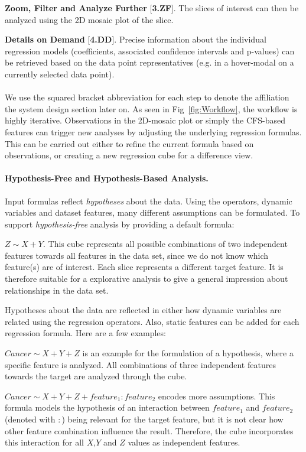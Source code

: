 \documentclass[journal]{style/vgtc} 			          %
\begin{document}
\textbf{Zoom, Filter and Analyze Further} [\textbf{3.ZF}]. The slices of interest can then be analyzed using the 2D mosaic plot of the slice.

\textbf{Details on Demand} [\textbf{4.DD}]. Precise information about the individual regression models (coefficients, associated confidence intervals and p-values) can be retrieved based on the data point representatives (e.g. in a hover-modal on a currently selected data point).
\\\\
We use the squared bracket abbreviation for each step to denote the affiliation the system design section later on.
As seen in Fig~\ref{fig:Workflow}, the workflow is highly iterative.
Observations in the 2D-mosaic plot or simply the CFS-based features can trigger new analyses by adjusting the underlying regression formulas.
This can be carried out either to refine the current formula based on observations, or creating a new regression cube for a difference view.
\paragraph{Hypothesis-Free and Hypothesis-Based Analysis.}
Input formulas reflect \emph{hypotheses} about the data.
Using the operators, dynamic variables and dataset features, many different assumptions can be formulated.
To support \emph{hypothesis-free} analysis by providing a default formula:

$Z \sim X + Y$.
This cube represents all possible combinations of two independent features towards all features in the data set, since we do not know which feature(s) are of interest.
Each slice represents a different target feature.
It is therefore suitable for a explorative analysis to give a general impression about relationships in the data set.

Hypotheses about the data are reflected in either how dynamic variables are related using the regression operators.
Also, static features can be added for each regression formula.
Here are a few examples:

$Cancer \sim X + Y + Z$ is an example for the formulation of a hypothesis, where a specific feature is analyzed.
All combinations of three independent features towards the target are analyzed through the cube.

$Cancer \sim X + Y + Z + feature_1:feature_2$ encodes more assumptions.
This formula models the hypothesis of an interaction between $feature_1$ and $feature_2$ (denoted with $:$) being relevant for the target feature, but it is not clear how other feature combination influence the result.
Therefore, the cube incorporates this interaction for all $X$,$Y$ and $Z$ values as independent features.
\end{document}
